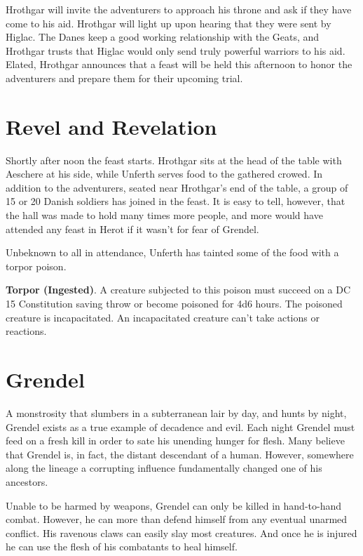 \documentclass[10pt,twoside,twocolumn,openany]{book}
\begin{document}
Hrothgar will invite the adventurers to approach his throne and ask if they have come to his aid. Hrothgar will light up upon hearing that they were sent by Higlac. The Danes keep a good working relationship with the Geats, and Hrothgar trusts that Higlac would only send truly powerful warriors to his aid. Elated, Hrothgar announces that a feast will be held this afternoon to honor the adventurers and prepare them for their upcoming trial.

\section{Revel and Revelation}
Shortly after noon the feast starts. Hrothgar sits at the head of the table with Aeschere at his side, while Unferth serves food to the gathered crowed. In addition to the adventurers, seated near Hrothgar's end of the table, a group of 15 or 20 Danish soldiers has joined in the feast. It is easy to tell, however, that the hall was made to hold many times more people, and more would have attended any feast in Herot if it wasn't for fear of Grendel.

Unbeknown to all in attendance, Unferth has tainted some of the food with a torpor poison.

\begin{paperbox}{}
\textbf{Torpor (Ingested)}. A creature subjected to this poison must succeed on a DC 15 Constitution saving throw or become poisoned for 4d6 hours. The poisoned creature is incapacitated. An incapacitated creature can't take actions or reactions.
\end{paperbox}

\clearpage

\section{\textbf{Grendel}}
A monstrosity that slumbers in a subterranean lair by day, and hunts by night, Grendel exists as a true example of decadence and evil. Each night Grendel must feed on a fresh kill in order to sate his unending hunger for flesh. Many believe that Grendel is, in fact, the distant descendant of a human. However, somewhere along the lineage a corrupting influence fundamentally changed one of his ancestors.

Unable to be harmed by weapons, Grendel can only be killed in hand-to-hand combat. However, he can more than defend himself from any eventual unarmed conflict. His ravenous claws can easily slay most creatures. And once he is injured he can use the flesh of his combatants to heal himself.
\end{document}
